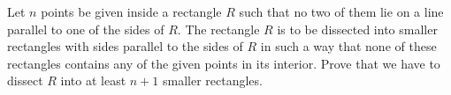 Let $n$ points be given inside a rectangle $R$ such that no two of them lie on a line parallel to one of the sides of $R$. The rectangle $R$ is to be dissected into smaller rectangles with sides parallel to the sides of $R$ in such a way that none of these rectangles contains any of the given points in its interior. Prove that we have to dissect $R$ into at least $n+1$ smaller rectangles.
